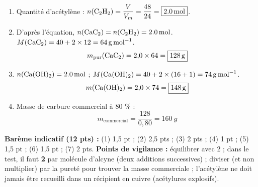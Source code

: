 \documentclass[11pt]{article}
\begin{document}
\begin{corrige}
\begin{enumerate}
\[ \ce{C2H2 + 2 Br2 -> CHBr2-CHBr2} \quad \text{(1,1,2,2-tétrabromoéthane, incolore)} \]
\item Quantité d'acétylène : $n(\ce{C2H2}) = \dfrac{V}{V_m} = \dfrac{48}{24} = \boxed{\SI{2,0}{mol}}$.
\item D'après l'équation, $n(\ce{CaC2}) = n(\ce{C2H2}) = \SI{2,0}{mol}$. $M(\ce{CaC2}) = 40 + 2 \times 12 = \SI{64}{g.mol^{-1}}$.
\[ m_{\text{pur}}(\ce{CaC2}) = 2{,}0 \times 64 = \boxed{\SI{128}{g}} \]
\item $n(\ce{Ca(OH)2}) = \SI{2,0}{mol}$ ; $M(\ce{Ca(OH)2}) = 40 + 2 \times (16 + 1) = \SI{74}{g.mol^{-1}}$.
\[ m(\ce{Ca(OH)2}) = 2{,}0 \times 74 = \boxed{\SI{148}{g}} \]
\item Masse de carbure commercial à 80 \% :
\[ m_{\text{commercial}} = \frac{128}{0{,}80} = \boxed{\SI{160}{g}} \]
\end{enumerate}
\textbf{Barème indicatif (12 pts) :} (1) 1,5 pt ; (2) 2,5 pts ; (3) 2 pts ; (4) 1 pt ; (5) 1,5 pt ; (6) 1,5 pt ; (7) 2 pts. \textbf{Points de vigilance :} équilibrer avec 2  ; dans le test, il faut \textbf{2 } par molécule d'alcyne (deux additions successives) ; diviser (et non multiplier) par la pureté pour trouver la masse commerciale ; l'acétylène ne doit jamais être recueilli dans un récipient en cuivre (acétylures explosifs).
\end{corrige}
\end{document}

